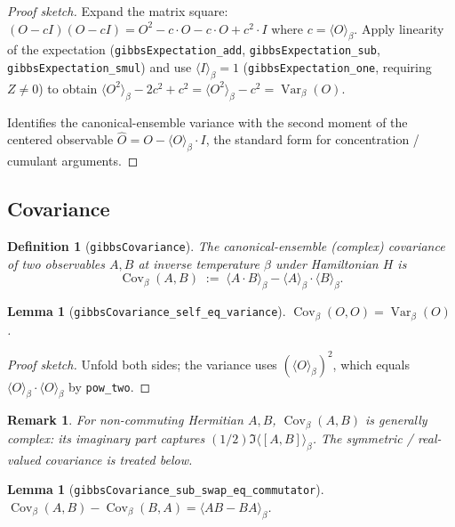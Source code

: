 \documentclass[a4paper,11pt]{article}
\newtheorem{lemma}[theorem]{Lemma}
\newtheorem{definition}[theorem]{Definition}
\newtheorem{remark}[theorem]{Remark}
\begin{document}
\begin{proof}[Proof sketch]
Expand the matrix square:
$(O - c I)(O - c I) = O^2 - c \cdot O - c \cdot O + c^2 \cdot I$
where $c = \langle O \rangle_\beta$.  Apply linearity of the
expectation (\texttt{gibbsExpectation\_add}, \texttt{gibbsExpectation\_sub},
\texttt{gibbsExpectation\_smul}) and use
$\langle I \rangle_\beta = 1$ (\texttt{gibbsExpectation\_one},
requiring $Z \neq 0$) to obtain
$\langle O^2 \rangle_\beta - 2 c^2 + c^2 = \langle O^2 \rangle_\beta - c^2
 = \operatorname{Var}_\beta(O)$.

Identifies the canonical-ensemble variance with the second moment of
the centered observable $\hat O = O - \langle O \rangle_\beta \cdot I$,
the standard form for concentration / cumulant arguments.
\end{proof}

\subsection{Covariance}
\label{subsec:gibbs-covariance}

\begin{definition}[\texttt{gibbsCovariance}]
The canonical-ensemble (complex) covariance of two observables
$A, B$ at inverse temperature $\beta$ under Hamiltonian $H$ is
\[
  \operatorname{Cov}_\beta(A, B)
  \;:=\;
  \langle A \cdot B \rangle_\beta
  - \langle A \rangle_\beta \cdot \langle B \rangle_\beta.
\]
\end{definition}

\begin{lemma}[\texttt{gibbsCovariance\_self\_eq\_variance}]
$\operatorname{Cov}_\beta(O, O) = \operatorname{Var}_\beta(O)$.
\end{lemma}

\begin{proof}[Proof sketch]
Unfold both sides; the variance uses $(\langle O \rangle_\beta)^2$,
which equals $\langle O \rangle_\beta \cdot \langle O \rangle_\beta$
by \texttt{pow\_two}.
\end{proof}

\begin{remark}
For non-commuting Hermitian $A, B$, $\operatorname{Cov}_\beta(A, B)$
is generally complex: its imaginary part captures
$(1/2) \Im\langle [A, B] \rangle_\beta$.  The symmetric / real-valued
covariance is treated below.
\end{remark}

\begin{lemma}[\texttt{gibbsCovariance\_sub\_swap\_eq\_commutator}]
$\operatorname{Cov}_\beta(A, B) - \operatorname{Cov}_\beta(B, A)
 = \langle A B - B A \rangle_\beta$.
\end{lemma}
\end{document}
